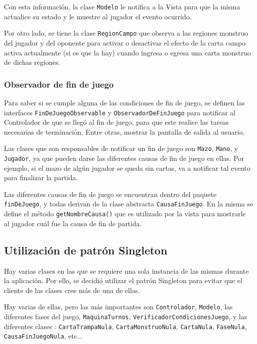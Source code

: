 	Con esta información, la clase \texttt{Modelo} le notifica a la Vista para que la misma actualice su estado y le muestre al jugador el evento ocurrido.
	
	Por otro lado, se tiene la clase \texttt{RegionCampo} que observa a las regiones monstruo del jugador y del oponente para activar o desactivar el efecto de la carta campo activa actualmente (si es que la hay) cuando ingresa o egresa una carta monstruo de dichas regiones.
	
	\subsubsection{Observador de fin de juego}
	
	Para saber si se cumple alguna de las condiciones de fin de juego, se definen las interfaces \texttt{FinDeJuegoObservable} y \texttt{ObservadorDeFinJuego} para notificar al Controlador de que se llegó al fin de juego, para que este realice las tareas necesarias de terminación. Entre otras, mostrar la pantalla de salida al usuario.
	
	Las clases que son responsables de notificar un fin de juego son \texttt{Mazo}, \texttt{Mano}, y \texttt{Jugador}, ya que pueden darse las diferentes causas de fin de juego en ellas. Por ejemplo, si el mazo de algún jugador se queda sin cartas, va a notificar tal evento para finalizar la partida.
	
	Las diferentes causas de fin de juego se encuentran dentro del paquete \texttt{finDeJuego}, y todas derivan de la clase abstracta \texttt{CausaFinJuego}. En la misma se define el método \texttt{getNombreCausa()} que es utilizado por la vista para mostrarle al jugador cuál fue la causa de fin de partida.
	
	
	
	\subsection{Utilización de patrón Singleton}
	
	Hay varias clases en las que se requiere una sola instancia de las mismas durante la aplicación. Por ello, se decidió utilizar el patrón Singleton para evitar que el cliente de las clases cree más de una de ellas.
	
	Hay varias de ellas, pero las más importantes son \texttt{Controlador}, \texttt{Modelo}, las diferentes fases del juego, \texttt{MaquinaTurnos}, \texttt{VerificadorCondicionesJuego}, y las diferentes clases : \texttt{CartaTrampaNula}, \texttt{CartaMonstruoNula}, \texttt{CartaNula}, \texttt{FaseNula}, \texttt{CausaFinJuegoNula}, etc...
	
